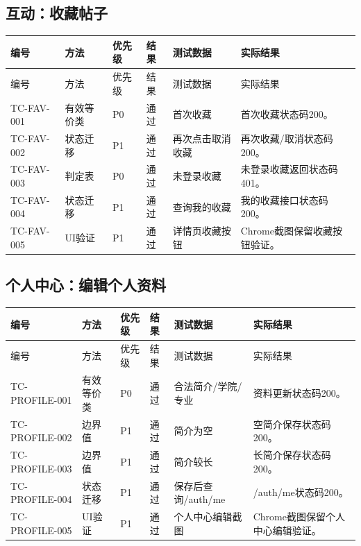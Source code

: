 \documentclass[bwprint]{report}
\begin{document}
\subsection{互动：收藏帖子}
{\footnotesize
\setlength{\tabcolsep}{3pt}
\begin{longtable}{P{2.0cm}P{2.0cm}P{0.9cm}P{0.9cm}P{3.4cm}P{5.4cm}}
\toprule
编号 & 方法 & 优先级 & 结果 & 测试数据 & 实际结果\\
\midrule
\endfirsthead
\toprule
编号 & 方法 & 优先级 & 结果 & 测试数据 & 实际结果\\
\midrule
\endhead
TC-FAV-001 & 有效等价类 & P0 & 通过 & 首次收藏 & 首次收藏状态码200。 \\
TC-FAV-002 & 状态迁移 & P1 & 通过 & 再次点击取消收藏 & 再次收藏/取消状态码200。 \\
TC-FAV-003 & 判定表 & P0 & 通过 & 未登录收藏 & 未登录收藏返回状态码401。 \\
TC-FAV-004 & 状态迁移 & P1 & 通过 & 查询我的收藏 & 我的收藏接口状态码200。 \\
TC-FAV-005 & UI验证 & P1 & 通过 & 详情页收藏按钮 & Chrome截图保留收藏按钮验证。 \\
\bottomrule
\end{longtable}
}
\subsection{个人中心：编辑个人资料}
{\footnotesize
\setlength{\tabcolsep}{3pt}
\begin{longtable}{P{2.0cm}P{2.0cm}P{0.9cm}P{0.9cm}P{3.4cm}P{5.4cm}}
\toprule
编号 & 方法 & 优先级 & 结果 & 测试数据 & 实际结果\\
\midrule
\endfirsthead
\toprule
编号 & 方法 & 优先级 & 结果 & 测试数据 & 实际结果\\
\midrule
\endhead
TC-PROFILE-001 & 有效等价类 & P0 & 通过 & 合法简介/学院/专业 & 资料更新状态码200。 \\
TC-PROFILE-002 & 边界值 & P1 & 通过 & 简介为空 & 空简介保存状态码200。 \\
TC-PROFILE-003 & 边界值 & P1 & 通过 & 简介较长 & 长简介保存状态码200。 \\
TC-PROFILE-004 & 状态迁移 & P1 & 通过 & 保存后查询/auth/me & /auth/me状态码200。 \\
TC-PROFILE-005 & UI验证 & P1 & 通过 & 个人中心编辑截图 & Chrome截图保留个人中心编辑验证。 \\
\bottomrule
\end{longtable}
}
\end{document}
